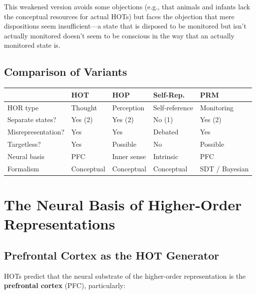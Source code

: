\documentclass[11pt,a4paper]{report}
\begin{document}
This weakened version avoids some objections (e.g., that animals and infants lack the conceptual resources for actual HOTs) but faces the objection that mere dispositions seem insufficient---a state that is disposed to be monitored but isn't actually monitored doesn't seem to be conscious in the way that an actually monitored state is.

\section{Comparison of Variants}

\begin{center}
\renewcommand{\arraystretch}{1.4}
\begin{tabular}{>{\raggedright}p{2.5cm} >{\centering}p{2cm} >{\centering}p{2.3cm} >{\centering}p{2.3cm} >{\centering\arraybackslash}p{2.5cm}}
  \toprule
  & \textbf{HOT} & \textbf{HOP} & \textbf{Self-Rep.} & \textbf{PRM} \\
  \midrule
  HOR type & Thought & Perception & Self-reference & Monitoring \\
  Separate states? & Yes (2) & Yes (2) & No (1) & Yes (2) \\
  Misrepresentation? & Yes & Yes & Debated & Yes \\
  Targetless? & Yes & Possible & No & Possible \\
  Neural basis & PFC & Inner sense & Intrinsic & PFC \\
  Formalism & Conceptual & Conceptual & Conceptual & SDT / Bayesian \\
  \bottomrule
\end{tabular}
\end{center}


\chapter{The Neural Basis of Higher-Order Representations}

\section{Prefrontal Cortex as the HOT Generator}

HOTs predict that the neural substrate of the higher-order representation is the \textbf{prefrontal cortex} (PFC), particularly:
\end{document}
